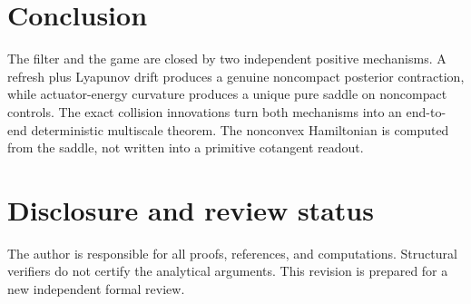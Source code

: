 \documentclass[11pt,reqno]{amsart}
\theoremstyle{definition}
\theoremstyle{remark}
\begin{document}
\section{Conclusion}

The filter and the game are closed by two independent positive mechanisms.  A
refresh plus Lyapunov drift produces a genuine noncompact posterior
contraction, while actuator-energy curvature produces a unique pure saddle on
noncompact controls.  The exact collision innovations turn both mechanisms
into an end-to-end deterministic multiscale theorem.  The nonconvex
Hamiltonian is computed from the saddle, not written into a primitive
cotangent readout.

\section*{Disclosure and review status}
The author is responsible for all proofs, references, and computations.
Structural verifiers do not certify the analytical arguments.  This revision
is prepared for a new independent formal review.



\end{document}
